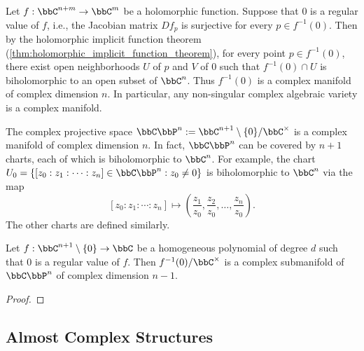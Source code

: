     \begin{example}\label{eg:complex_manifold_by_holomorphic_implicit_function_theorem}
        Let \(f: \bbC^{n+m}\to \bbC^m\) be a holomorphic function.
        Suppose that \(0\) is a regular value of \(f\), i.e., the Jacobian matrix \(Df_p\) is surjective for every \(p\in f^{-1}(0)\).
        Then by the holomorphic implicit function theorem (\cref{thm:holomorphic_implicit_function_theorem}),
        for every point \(p\in f^{-1}(0)\), there exist open neighborhoods \(U\) of \(p\) and \(V\) of \(0\) such that \(f^{-1}(0)\cap U\) is biholomorphic to an open subset of \(\bbC^n\).
        Thus \(f^{-1}(0)\) is a complex manifold of complex dimension \(n\).
        In particular, any non-singular complex algebraic variety is a complex manifold.
    \end{example}

    \begin{example}\label{eg:complex_projective_space_as_complex_manifold}
        The complex projective space \(\bbC\bbP^n:= \bbC^{n+1}\setminus \{0\}/\bbC^\times\) is a complex manifold of complex dimension \(n\).
        In fact, \(\bbC\bbP^n\) can be covered by \(n+1\) charts, each of which is biholomorphic to \(\bbC^n\).
        For example, the chart \(U_0 = \{[z_0: z_1: \cdots: z_n]\in \bbC\bbP^n: z_0\neq 0\}\) is biholomorphic to \(\bbC^n\) via the map
        \[
            [z_0: z_1: \cdots: z_n] \mapsto \left(\frac{z_1}{z_0}, \frac{z_2}{z_0}, \ldots, \frac{z_n}{z_0}\right).
        \]
        The other charts are defined similarly.
    \end{example}

    \begin{proposition}\label{prop:zero_locus_of_homogeneous_polynomial_in_CPn}
        Let \(f:\bbC^{n+1}\setminus \{0\} \to \bbC\) be a homogeneous polynomial of degree \(d\) such that \(0\) is a regular value of \(f\).
        Then \(f^{-1}(0)/\bbC^\times\) is a complex submanifold of \(\bbC\bbP^n\) of complex dimension \(n-1\).
    \end{proposition}
    \begin{proof}
    \end{proof}

\subsection{Almost Complex Structures}

